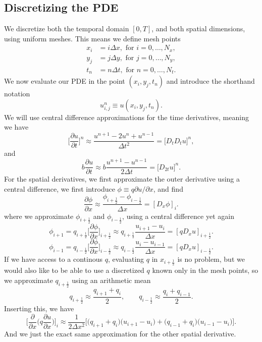 \documentclass[a4paper, 11pt, notitlepage, english]{article}
\newcommand{\p}{\partial}
\begin{document}
\subsection*{Discretizing the PDE}
We discretize both the temporal domain $[0,T]$, and both spatial dimensions, using uniform meshes. This means we define mesh points
\begin{align*}
x_i &= i\Delta x, \mbox{ for } i=0,\ldots,N_x, \\
y_j &= j\Delta y, \mbox{ for } j=0,\ldots,N_y, \\
t_n &= n\Delta t, \mbox{ for } n=0,\ldots,N_t.
\end{align*}
We now evaluate our PDE in the point $(x_i, y_j, t_n)$ and introduce the shorthand notation
$$u_{i,j}^n \equiv u(x_i, y_j, t_n).$$
We will use central difference approximations for the time derivatives, meaning we have
$$\bigg[\frac{\p u}{\p t}\bigg]^n \approx \frac{u^{n+1} - 2u^n + u^{n-1}}{\Delta t^2} = \bigg[D_tD_t u\bigg]^n,$$
and
$$b\frac{\p u}{\p t} \approx b \frac{u^{n+1}-u^{n-1}}{2\Delta t} = \bigg[D_{2t}u\bigg]^n.$$
For the spatial derivatives, we first approximate the outer derivative using a central difference, we first introduce $\phi \equiv q \p u/\p x$, and find
$$\frac{\p \phi}{\p x} \approx \frac{\phi_{i+\frac{1}{2}} - \phi_{i-\frac{1}{2}}}{\Delta x} = [D_x \phi]_{i}.$$
where we approximate $\phi_{i+\frac{1}{2}}$ and $\phi_{i-\frac{1}{2}}$, using a central difference yet again
$$\phi_{i+1} = q_{i+\frac{1}{2}}\bigg[\frac{\p \phi}{\p x}\bigg]_{i+\frac{1}{2}} \approx q_{i+\frac{1}{2}} \frac{u_{i+1} - u_{i}}{\Delta x} = [qD_x u]_{i+\frac{1}{2}}.$$
$$\phi_{i-1} = q_{i-\frac{1}{2}}\bigg[\frac{\p \phi}{\p x}\bigg]_{i-\frac{1}{2}} \approx q_{i-\frac{1}{2}} \frac{u_{i} - u_{i-1}}{\Delta x} = [qD_x u]_{i-\frac{1}{2}}.$$
If we have access to a continous $q$, evaluating $q$ in $x_{i+\frac{1}{2}}$ is no problem, but we would also like to be able to use a discretized $q$ known only in the mesh points, so we approximate $q_{i+\frac{1}{2}}$ using an arithmetic mean
$$q_{i+\frac{1}{2}} \approx \frac{q_{i+1} + q_i}{2}, \qquad q_{i-\frac{1}{2}} \approx \frac{q_{i} + q_{i-1}}{2}.$$
Inserting this, we have
$$\bigg[\frac{\p}{\p x}\bigg(q\frac{\p u}{\p x}\bigg)\bigg]_i \approx \frac{1}{2\Delta x^2}\bigg[\big(q_{i+1}+q_i\big)\big(u_{i+1}-u_i\big) + \big(q_{i-1} + q_i\big)\big(u_{i-1}-u_i\big)\bigg].$$
And we just the exact same approximation for the other spatial derivative.
\end{document}
